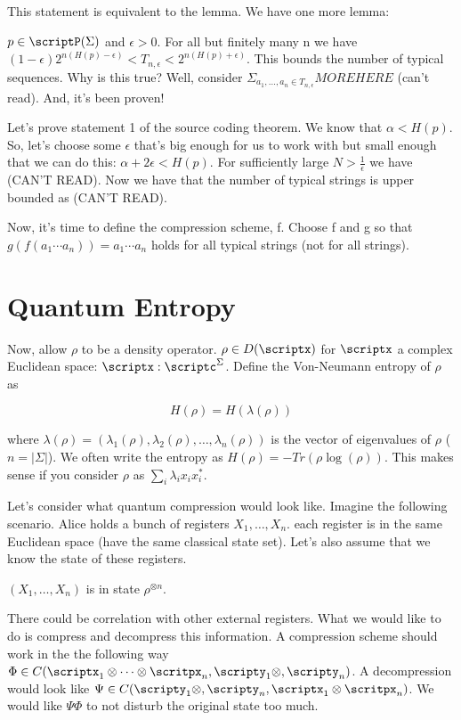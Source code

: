 \documentclass{article}
\begin{document}
    This statement is equivalent to the lemma. We have one more lemma:

    $ p \in \scriptP(\Sigma) $ and $\epsilon > 0$. For all but finitely
    many n we have $ (1-\epsilon)2^{n(H(p)-\epsilon)} < T_{n,\epsilon} <
    2^{n(H(p)+\epsilon)} $. This bounds the number of typical sequences.
    Why is this true? Well, consider $ \Sigma_{a_1,\ldots,a_n \in
    T_{n,\epsilon}}  MORE HERE $  (can't read). And, it's been proven!

    Let's prove statement 1 of the source coding theorem. We know that
    $\alpha < H(p)$. So, let's choose some $\epsilon$ that's big enough
    for us to work with but small enough that we can do this: $ \alpha +
    2\epsilon < H(p)$. For sufficiently large $N > \frac{1}{\epsilon}$
    we have (CAN'T READ). Now we have that the number of typical strings
    is upper bounded as (CAN'T READ).

    Now, it's time to define the compression scheme, f. Choose f and g
    so that $g(f(a_1\cdots a_n)) = a_1\cdots a_n$ holds for all typical
    strings (not for all strings).
   
\section{Quantum Entropy}
Now, allow $\rho$ to be a density operator. $\rho \in D(\scriptx)$ for
$\scriptx$ a complex Euclidean space: $\scriptx: \scriptc^\Sigma$.
Define the Von-Neumann entropy of $\rho$ as 

\[ 
        H(\rho) = H(\lambda(\rho)) 
\]

where $\lambda(\rho) = (\lambda_1(\rho), \lambda_2(\rho), \ldots,
\lambda_n(\rho))$ is the vector of eigenvalues of $\rho$ ($n =
|\Sigma|$). We often write the entropy as $ H(\rho) =
-Tr(\rho\log(\rho)) $. This makes sense if you consider $\rho$ as
$\sum\limits_{i} \lambda_i x_i x_i^*$.

Let's consider what quantum compression would look like. Imagine the
following scenario. Alice holds a bunch of registers $X_1,\ldots,X_n$.
each register is in the same Euclidean space (have the same classical
state set). Let's also assume that we know the state of these registers.

$(X_1,\ldots,X_n)$ is in state $ \rho^{\otimes n} $.

There could be correlation with other external registers. What we would
like to do is compress and decompress this information. A compression
scheme should work in the the following way $\Phi \in
C(\scriptx_1\otimes\cdots\otimes\scritpx_n, \scripty_1\otimes,\scripty_n)$. A
decompression would look like $\Psi \in
C(\scripty_1\otimes,\scripty_n,\scriptx_1\otimes\scritpx_n)$. We would
like $\Psi\Phi $ to not disturb the original state too much.
\end{document}
